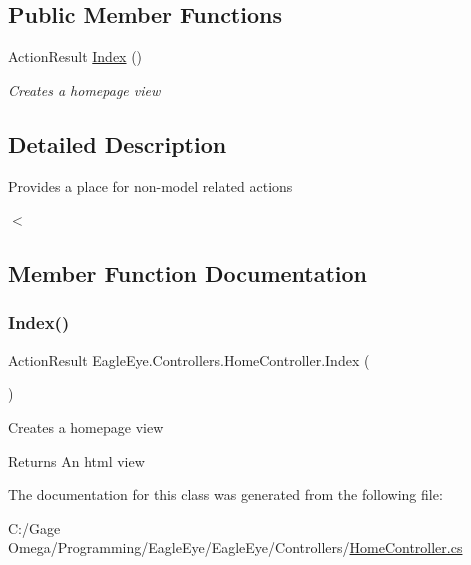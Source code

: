 \subsection*{Public Member Functions}
\begin{DoxyCompactItemize}
\item 
Action\+Result \mbox{\hyperlink{class_eagle_eye_1_1_controllers_1_1_home_controller_a514cfcd727b9415f4918ee62072b1259}{Index}} ()
\begin{DoxyCompactList}\small\item\em Creates a homepage view \end{DoxyCompactList}\end{DoxyCompactItemize}


\subsection{Detailed Description}
Provides a place for non-\/model related actions 

$<$ 

\subsection{Member Function Documentation}
\mbox{\label{class_eagle_eye_1_1_controllers_1_1_home_controller_a514cfcd727b9415f4918ee62072b1259}} 
\subsubsection{\texorpdfstring{Index()}{Index()}}
{\footnotesize\ttfamily Action\+Result Eagle\+Eye.\+Controllers.\+Home\+Controller.\+Index (\begin{DoxyParamCaption}{ }\end{DoxyParamCaption})}



Creates a homepage view 

\begin{DoxyReturn}{Returns}
An html view
\end{DoxyReturn}


The documentation for this class was generated from the following file\+:\begin{DoxyCompactItemize}
\item 
C\+:/\+Gage Omega/\+Programming/\+Eagle\+Eye/\+Eagle\+Eye/\+Controllers/\mbox{\hyperlink{_home_controller_8cs}{Home\+Controller.\+cs}}\end{DoxyCompactItemize}
